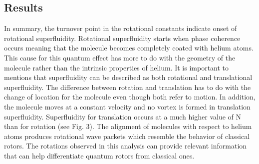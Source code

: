 \documentclass[a0b,landscape]{a0poster}
\begin{document}
\begin{multicols}{3}
\section*{Results}
In summary, the turnover point in the rotational constants indicate onset of rotational superfluidity.  Rotational superfluidity starts when phase coherence occurs meaning that the molecule becomes completely coated with helium atoms. This cause for this quantum effect has more to do with the geometry of the molecule rather than the intrinsic properties of helium.  It is important to mentions that superfluidity can be described as both rotational and translational superfluidity.  The difference between rotation and translation has to do with the change of location for the molecule even though both refer to motion.  In addition, the molecule moves at a constant velocity and no vortex is formed in translation superfluidity.  Superfluidity for translation occurs at a much higher value of N than for rotation (see Fig. 3).  The alignment of molecules with respect to helium atoms produces rotational wave packets which resemble the behavior of classical rotors.  The rotations observed in this analysis can provide relevant information that can help differentiate quantum rotors from classical ones.


\end{multicols}
\end{document}
